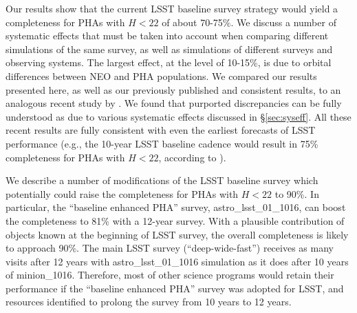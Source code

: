 Our results show that the current LSST baseline survey strategy would yield a completeness for PHAs 
with $H<22$ of about 70-75\%. We discuss a number of systematic effects that must be taken into 
account when comparing different simulations of the same survey, as well as simulations of different
surveys and observing systems. The largest effect, at the level of 10-15\%, is due to orbital differences 
between NEO and PHA populations. We compared our results presented here, as well as our previously
published and consistent results, to an analogous recent study by \citet[]{GMS2016}. We found that 
purported discrepancies can be fully understood as due to various systematic effects discussed in 
\S\ref{sec:syseff}. All these recent results are fully consistent with even the earliest forecasts of LSST 
performance (e.g., the 10-year LSST baseline cadence would result in 75\% completeness for PHAs 
with $H<22$, according to \citealt{IvezicNEO2007}). 

We describe a number of modifications of the LSST baseline survey which potentially could raise the 
completeness for PHAs with $H<22$ to 90\%. In particular, the ``baseline enhanced PHA'' survey,
astro\_lsst\_01\_1016, can boost the completeness to 81\% with a 12-year survey. With a plausible
contribution of objects known at the beginning of LSST survey, the overall completeness is likely 
to approach 90\%. The main LSST survey (``deep-wide-fast'') receives as many visits after 12 years 
with astro\_lsst\_01\_1016 simulation as it does after 10 years of minion\_1016. Therefore, 
most of other science programs would retain their performance if the ``baseline enhanced PHA'' survey
was adopted for LSST, and resources identified to prolong the survey from 10 years to 12 years. 
